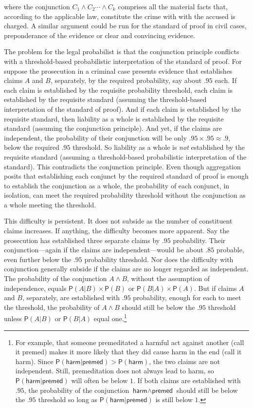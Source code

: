 \documentclass[
  10pt,
  dvipsnames,enabledeprecatedfontcommands]{scrartcl}
\newcommand{\et}{\wedge}
\newcommand{\pr}[1]{\ensuremath{\mathsf{P}(#1)}}
\begin{document}
\noindent where the conjunction \(C_1 \et C_2 \cdots \et C_k\) comprises
all the material facts that, according to the applicable law, constitute
the crime with with the accused is charged. A similar argument could be
run for the standard of proof in civil cases, preponderance of the
evidence or clear and convincing evidence.

The problem for the legal probabilist is that the conjunction principle
conflicts with a threshold-based probabilistic interpretation of the
standard of proof. For suppose the prosecution in a criminal case
presents evidence that establishes claims \(A\) and \(B\), separately,
by the required probability, say about \(.95\) each. If each claim is
established by the requisite probability threshold, each claim is
established by the requisite standard (assuming the threshold-based
interpretation of the standard of proof). And if each claim is
established by the requisite standard, then liability as a whole is
established by the requisite standard (assuming the conjunction
principle). And yet, if the claims are independent, the probability of
their conjunction will be only \(.95\times .95 \approx .9\), below the
required \(.95\) threshold. So liability as a whole is \textit{not}
established by the requisite standard (assuming a threshold-based
probabilistic interpretation of the standard). This contradicts the
conjunction principle. Even though aggregation posits that establishing
each conjunct by the required standard of proof is enough to establish
the conjunction as a whole, the probability of each conjunct, in
isolation, can meet the required probability threshold without the
conjunction as a whole meeting the threshold.

This difficulty is persistent. It does not subside as the number of
constituent claims increases. If anything, the difficulty becomes more
apparent. Say the prosecution has established three separate claims by
\(.95\) probability. Their conjunction---again if the claims are
independent---would be about \(.85\) probable, even further below the
\(.95\) probability threshold. Nor does the difficulty with conjunction
generally subside if the claims are no longer regarded as independent.
The probability of the conjunction \(A \et B\), without the assumption
of independence, equals \(\pr{A \vert B} \times \pr{B}\) or
\(\pr{B \vert A} \times \pr{A}\). But if claims \(A\) and \(B\),
separately, are established with \(.95\) probability, enough for each to
meet the threshold, the probability of \(A \et B\) should still be below
the \(.95\) threshold unless \(\pr{A \vert B}\) or \(\pr{B \vert A}\)
equal one.\footnote{For example, that someone premeditated a harmful act
  against another (call it \textsf{premed}) makes it more likely that
  they did cause harm in the end (call it \textsf{harm}). Since
  \(\pr{\textsf{harm} \vert \textsf{premed}} > \pr{\textsf{harm}}\), the
  two claims are not independent. Still, premeditation does not always
  lead to harm, so \(\pr{\textsf{harm} \vert \textsf{premed}}\) will
  often be below \(1\). If both claims are established with \(.95\), the
  probability of the conjunction \(\textsf{harm} \et \textsf{premed}\)
  should still be below the \(.95\) threshold so long as
  \(\pr{\textsf{harm} \vert \textsf{premed}}\) is still below \(1\).}
\end{document}
